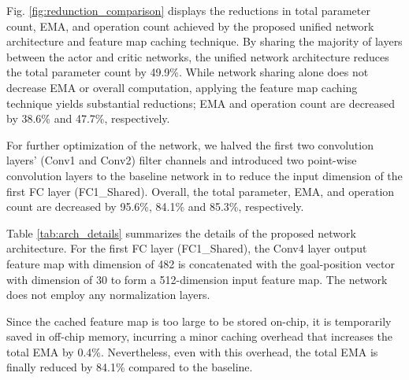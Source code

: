 
Fig. \ref{fig:redunction_comparison} displays the reductions in total parameter count, EMA, and operation count achieved by the proposed unified network architecture and feature map caching technique. By sharing the majority of layers between the actor and critic networks, the unified network architecture reduces the total parameter count by 49.9\%. While network sharing alone does not decrease EMA or overall computation, applying the feature map caching technique yields substantial reductions; EMA and operation count are decreased by 38.6\% and 47.7\%, respectively.

For further optimization of the network, we halved the first two convolution layers' (Conv1 and Conv2) filter channels and introduced two point-wise convolution layers to the baseline network in \cite{NCTU} to reduce the input dimension of the first FC layer (FC1\_Shared). Overall, the total parameter, EMA, and operation count are decreased by 95.6\%, 84.1\% and 85.3\%, respectively.

Table \ref{tab:arch_details} summarizes the details of the proposed network architecture. For the first FC layer (FC1\_Shared), the Conv4 layer output feature map with dimension of 482 is concatenated with the goal-position vector with dimension of 30 to form a 512-dimension input feature map. The network does not employ any normalization layers.

Since the cached feature map is too large to be stored on-chip, it is temporarily saved in off-chip memory, incurring a minor caching overhead that increases the total EMA by 0.4\%. Nevertheless, even with this overhead, the total EMA is finally reduced by 84.1\% compared to the baseline.




